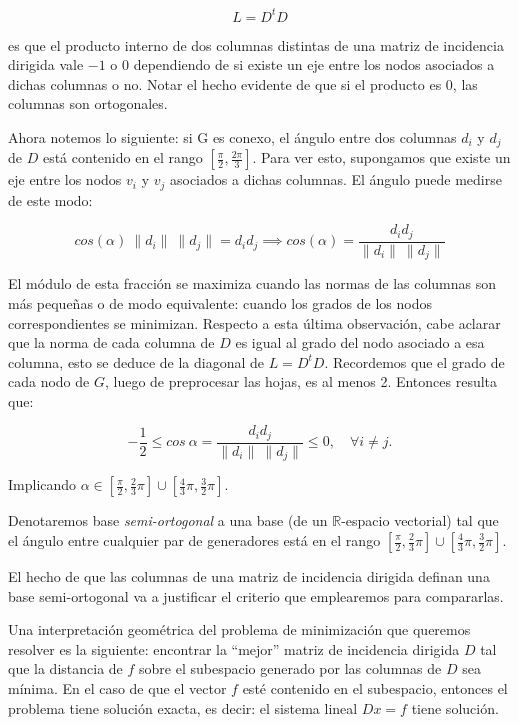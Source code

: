 \documentclass[conference,compsoc,a4paper]{IEEEtran}
\begin{document}
$$L = D^t D$$

\noindent es que el producto interno de dos columnas distintas de una matriz de 
incidencia dirigida vale $-1$ o $0$ dependiendo de si existe un eje 
entre los nodos asociados a dichas columnas o no. Notar el hecho 
evidente de que si el producto es $0$, las columnas son
 ortogonales.

\smallskip

Ahora notemos lo siguiente: si G es conexo, el ángulo entre dos 
columnas $d_i$ y $d_j$ de $D$ está contenido en el rango 
$[\frac{\pi}{2},\frac{2\pi}{3}]$. Para ver esto, supongamos que existe 
un eje entre los nodos $v_i$ y $v_j$ asociados a dichas columnas. 
El ángulo puede medirse de este modo:

$$cos(\alpha) \ \|d_i\| \ \|d_j\|= d_i  d_j \implies cos(\alpha) = 
\frac{d_i d_j}{\|d_i\| \ \|d_j\|}$$

El módulo de esta fracción se maximiza cuando las normas de las 
columnas son más pequeñas o de modo equivalente: cuando los grados de 
los nodos correspondientes se minimizan. Respecto a esta última 
observación, cabe aclarar que la norma de cada columna de $D$ es igual 
al grado del nodo asociado a esa columna, esto se deduce de la diagonal 
de $L = D^t D$. Recordemos que el grado de cada nodo de  $G$, luego de 
preprocesar las hojas, es al menos 2. Entonces resulta que:

$$-\frac{1}{2}\le cos \ \alpha = \frac{d_i d_j}{\|d_i\| \ \|d_j\|} \le 0,\quad \forall i\neq j.$$

\smallskip

\noindent Implicando
$\alpha\in[\frac{\pi}{2},\frac{2}{3}\pi]\cup [\frac{4}{3}\pi,\frac{3}{2}\pi]$.

\smallskip

Denotaremos base \textit{semi-ortogonal} a una base (de un 
$\mathbb{R}$-espacio vectorial) tal que el ángulo entre cualquier par de 
generadores está en el rango $[\frac{\pi}{2},\frac{2}{3}\pi]\cup [\frac{4}{3}\pi,\frac{3}{2}\pi]$.

\smallskip

El hecho de que las columnas de una matriz de incidencia dirigida 
definan una base semi-ortogonal va a justificar el criterio que 
emplearemos para compararlas.

\bigskip


Una interpretación geométrica del problema de minimización que queremos 
resolver es la siguiente: encontrar la ``mejor'' matriz de incidencia 
dirigida $D$ tal que la distancia de $f$ sobre el subespacio 
generado por las columnas de $D$ sea mínima. En el caso de que 
el vector $f$ esté contenido en el subespacio, entonces el problema 
tiene solución exacta, es decir: el sistema lineal $Dx = f$ tiene 
solución.
\end{document}
